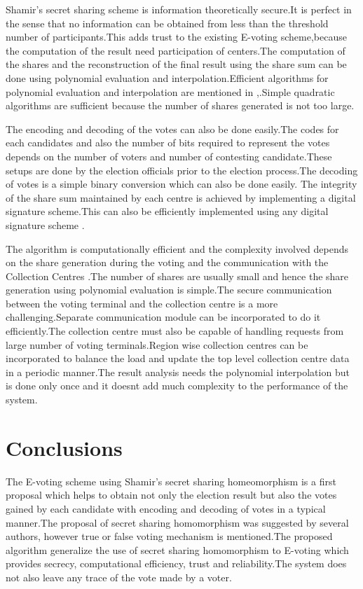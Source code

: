 \documentclass[conference]{IEEEtran}
\begin{document}
Shamir's secret sharing scheme is information theoretically secure.It is perfect in the sense that no information can be obtained from less than the threshold number of participants.This adds trust to the existing E-voting scheme,because the computation of the result need participation of  centers.The computation of the shares and the reconstruction of the final result using the share sum can be done using polynomial evaluation and interpolation.Efficient  algorithms for polynomial evaluation and interpolation are mentioned in \cite{aho1974design},\cite{lloyd1982art}.Simple quadratic algorithms are sufficient because the number of shares generated is not too large.

The encoding and decoding of the votes can also be done easily.The codes for each candidates and also the number of bits required to represent the votes depends on the number of voters and number of contesting candidate.These setups are done by the election officials prior  to the election process.The decoding of votes is a simple binary conversion which can also be done easily.
The integrity of the share sum maintained by each centre is achieved by implementing a digital signature scheme.This can also be efficiently implemented
using any digital signature scheme \cite{atreya2002digital}. 

The algorithm is computationally efficient and the complexity involved  depends on the share generation during the voting and the communication with the Collection Centres .The number of shares are usually small and hence the share generation using polynomial evaluation is simple.The secure communication between the voting terminal and the collection centre is a more challenging.Separate communication module can be incorporated to do it efficiently.The collection centre must also be capable of handling requests from large number of voting terminals.Region wise collection centres can be incorporated to balance the load and update the top level collection centre data in a periodic manner.The result analysis needs the polynomial interpolation but is done only once and it doesnt add much complexity to the performance of the system.


\section{Conclusions}
\label{section:conclusions}
The E-voting scheme using Shamir's secret sharing homeomorphism is a first proposal which helps to obtain not only the election result but also the votes gained by each candidate with encoding and decoding of votes in a typical manner.The proposal of secret sharing homomorphism was suggested by several authors, however true or false voting mechanism is mentioned.The proposed algorithm generalize the use of secret sharing homomorphism to E-voting which provides secrecy, computational efficiency, trust and reliability.The system does not also leave any trace of the vote made by a voter.
\end{document}
